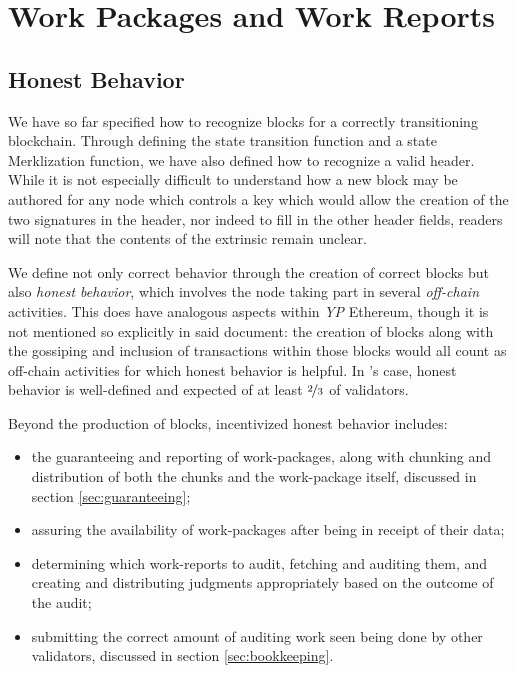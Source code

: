 \section{Work Packages and Work Reports}\label{sec:workpackagesandworkreports}

\newcommand*{\newavailabilityspecifier}{A}
\newcommand*{\itemtodigest}{C}
\newcommand*{\countupexports}{I}
\newcommand*{\importsegmentdata}{S}
\newcommand*{\justifysegmentdata}{J}
\newcommand*{\segrootlookup}{L}
\newcommand*{\pagedproofs}{P}
\newcommand*{\marshallrefine}{R}
\newcommand*{\extrinsicdata}{X}
\newcommand*{\wpX}{p}
\newcommand*{\wiX}{w}
\newcommand*{\segsX}{\mathbf{b}}
\newcommand*{\allexports}{\overline{\mathbf{e}}}

\subsection{Honest Behavior}

We have so far specified how to recognize blocks for a correctly transitioning \Jam blockchain. Through defining the state transition function and a state Merklization function, we have also defined how to recognize a valid header. While it is not especially difficult to understand how a new block may be authored for any node which controls a key which would allow the creation of the two signatures in the header, nor indeed to fill in the other header fields, readers will note that the contents of the extrinsic remain unclear.

We define not only correct behavior through the creation of correct blocks but also \emph{honest behavior}, which involves the node taking part in several \emph{off-chain} activities. This does have analogous aspects within \emph{YP} Ethereum, though it is not mentioned so explicitly in said document: the creation of blocks along with the gossiping and inclusion of transactions within those blocks would all count as off-chain activities for which honest behavior is helpful. In \Jam's case, honest behavior is well-defined and expected of at least $\nicefrac{2}{3}$ of validators.

Beyond the production of blocks, incentivized honest behavior includes:
\begin{itemize}
    \item the guaranteeing and reporting of work-packages, along with chunking and distribution of both the chunks and the work-package itself, discussed in section \ref{sec:guaranteeing};
    \item assuring the availability of work-packages after being in receipt of their data;
    \item determining which work-reports to audit, fetching and auditing them, and creating and distributing judgments appropriately based on the outcome of the audit;
    \item submitting the correct amount of auditing work seen being done by other validators, discussed in section \ref{sec:bookkeeping}.
\end{itemize}

